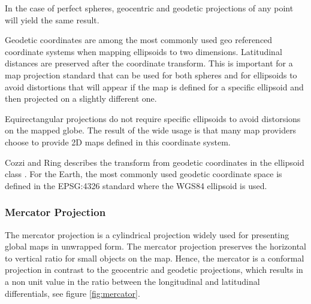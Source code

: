 In the case of perfect spheres, geocentric and geodetic projections of any point will yield the same result.

Geodetic coordinates are among the most commonly used geo referenced coordinate systems when mapping ellipsoids to two dimensions. Latitudinal distances are preserved after the coordinate transform. This is important for a map projection standard that can be used for both spheres and for ellipsoids to avoid distortions that will appear if the map is defined for a specific ellipsoid and then projected on a slightly different one.

Equirectangular projections do not require specific ellipsoids to avoid distorsions on the mapped globe. The result of the wide usage is that many map providers choose to provide 2D maps defined in this coordinate system.

Cozzi and Ring describes the transform from geodetic coordinates in the ellipsoid class \cite[p. 25]{cozzi11}. For the Earth, the most commonly used geodetic coordinate space is defined in the EPSG:4326 standard where the WGS84 ellipsoid is used.

\subsubsection{Mercator Projection}

The mercator projection is a cylindrical projection widely used for presenting global maps in unwrapped form. The mercator projection preserves the horizontal to vertical ratio for small objects on the map. Hence, the mercator is a conformal projection in contrast to the geocentric and geodetic projections, which results in a non unit value in the ratio between the longitudinal and latitudinal differentials, see figure \ref{fig:mercator}.

